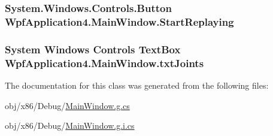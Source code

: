 \hypertarget{classWpfApplication4_1_1MainWindow_aab97058b3cbf0a1b083d1de7f011af39}{
\subsubsection[{Start\-Replaying}]{\setlength{\rightskip}{0pt plus 5cm}System.\-Windows.\-Controls.\-Button Wpf\-Application4.\-Main\-Window.\-Start\-Replaying\hspace{0.3cm}{\ttfamily [package]}}}\label{classWpfApplication4_1_1MainWindow_aab97058b3cbf0a1b083d1de7f011af39}
\hypertarget{classWpfApplication4_1_1MainWindow_a1c0b78db264ed19126b96830a5700bcd}{
\subsubsection[{txt\-Joints}]{\setlength{\rightskip}{0pt plus 5cm}System Windows Controls Text\-Box Wpf\-Application4.\-Main\-Window.\-txt\-Joints\hspace{0.3cm}{\ttfamily [package]}}}\label{classWpfApplication4_1_1MainWindow_a1c0b78db264ed19126b96830a5700bcd}


The documentation for this class was generated from the following files\-:\begin{DoxyCompactItemize}
\item 
obj/x86/\-Debug/\hyperlink{Debug_2MainWindow_8g_8cs}{Main\-Window.\-g.\-cs}\item 
obj/x86/\-Debug/\hyperlink{Debug_2MainWindow_8g_8i_8cs}{Main\-Window.\-g.\-i.\-cs}\end{DoxyCompactItemize}
